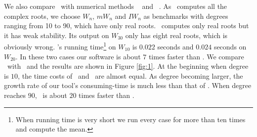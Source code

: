  
  We also compare \froot\  with numerical methods  \eign\ \cite{eigsolev} and \sle\ \cite{hemmer09}. As \eign\ computes all the complex roots, we choose $W_n$, $mW_n$ and $IW_n$ as benchmarks with degrees ranging from 10 to 90, which have only real roots. \sle\ computes only real roots but it has weak stability. Its output on $W_{30}$ only has eight real roots, which is obviously wrong. \sle's running time\footnote{When  running time is very short we run every case for more than ten times and compute the mean.} on $W_{10}$ is $0.022$ seconds and
 $0.024$ seconds on $W_{20}$. In these two cases our software is about $7$ times faster than \sle. We compare \froot\ with  \eign\ and the results are  shown in Figure \ref{fig:1}.
 At the beginning when degree is $10$, the time costs of \froot\ and \eign\ are
 almost equal. As degree becoming larger, the growth rate of our tool's consuming-time is much less than that of  \eign.  When degree reaches $90$, \froot\ is about $20$ times faster than \eign.



